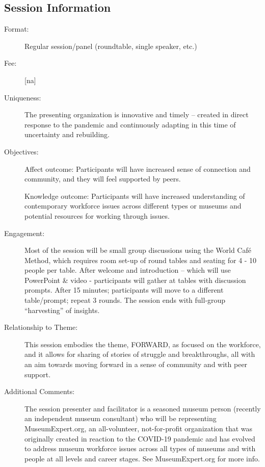 \documentclass{report}
\begin{document}
              \subsection*{Session Information}
                \begin{description}
                  \item [Format:] Regular session/panel (roundtable, single speaker, etc.)
							    
								  \item [Fee:][na]
							     
							    \item [Uniqueness:]The presenting organization is innovative and timely – created in direct response to the pandemic and continuously adapting in this time of uncertainty and rebuilding.
							    \item [Objectives:]Affect outcome: Participants will have increased sense of connection and community, and they will feel supported by peers.

Knowledge outcome: Participants will have increased understanding of contemporary workforce issues across different types or museums and potential resources for working through issues.
							    \item [Engagement:]Most of the session will be small group discussions using the World Café Method, which requires room set-up of round tables and seating for 4 - 10 people per table. After welcome and introduction – which will use PowerPoint \& video - participants will gather at tables with discussion prompts. After 15 minutes; participants will move to a different table/prompt; repeat 3 rounds. The session ends with full-group “harvesting” of insights.
							    \item [Relationship to Theme:]This session embodies the theme, FORWARD, as focused on the workforce, and it allows for sharing of stories of struggle and breakthroughs, all with an aim towards moving forward in a sense of community and with peer support.
							    
                    \item [Additional Comments: ]  The session presenter and facilitator is a seasoned museum person (recently an independent museum consultant) who will be representing MuseumExpert.org, an all-volunteer, not-for-profit organization that was originally created in reaction to the COVID-19 pandemic and has evolved to address museum workforce issues across all types of museums and with people at all levels and career stages. See MuseumExpert.org for more info.
 

                \end{description}
\end{document}
